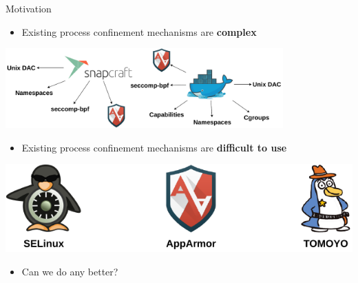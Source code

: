 \documentclass[12pt, dvipsnames]{beamer}
\begin{document}
\begin{frame}[c]{Motivation}
\begin{itemize}
    \item Existing process confinement mechanisms are \textbf{complex}
\end{itemize}
\begin{center}
    \color{black}
    \includegraphics[width=0.8\textwidth]{figs/process-confinement-landscape.pdf}
\end{center}
\begin{itemize}
    \item Existing process confinement mechanisms are \textbf{difficult to use}
\end{itemize}
\begin{center}
    \color{black}
    \includegraphics[height=0.2\textheight]{figs/mac.pdf}
\end{center}
\begin{itemize}
    \item Can we do any better?
\end{itemize}
\end{frame}
\end{document}
